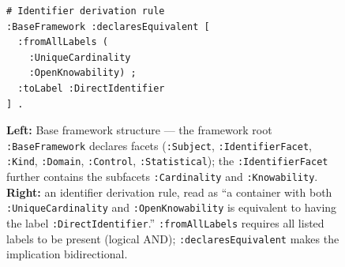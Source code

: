 \documentclass[runningheads,oneside]{llncs}
\begin{document}
\begin{figure}[ht]
\centering
\begin{minipage}[c]{0.51\textwidth}
\centering
{}
\end{minipage}%
\hspace{0.5em}%
\begin{minipage}[c]{0.47\textwidth}
\begin{lstlisting}[basicstyle=\ttfamily\scriptsize, frame=none]
# Identifier derivation rule
:BaseFramework :declaresEquivalent [
  :fromAllLabels (
    :UniqueCardinality
    :OpenKnowability) ;
  :toLabel :DirectIdentifier
] .
\end{lstlisting}
\end{minipage}
\caption{\textbf{Left:} Base framework structure --- the framework root \texttt{:BaseFramework} declares facets (\texttt{:Subject}, \texttt{:IdentifierFacet}, \texttt{:Kind}, \texttt{:Domain}, \texttt{:Control}, \texttt{:Statistical}); the \texttt{:IdentifierFacet} further contains the subfacets \texttt{:Cardinality} and \texttt{:Knowability}. \textbf{Right:} an identifier derivation rule, read as ``a container with both \texttt{:UniqueCardinality} and \texttt{:OpenKnowability} is equivalent to having the label \texttt{:DirectIdentifier}.'' \texttt{:fromAllLabels} requires all listed labels to be present (logical AND); \texttt{:declaresEquivalent} makes the implication bidirectional.}
\label{fig:base-framework-structure}
\end{figure}
\end{document}
